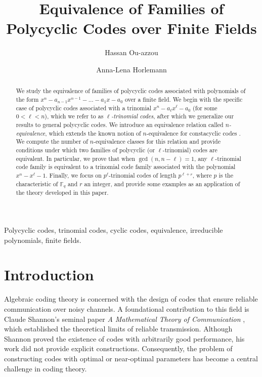 \documentclass[12pt]{elsarticle}
\title{\LARGE \bfseries
Equivalence of Families of Polycyclic   Codes over Finite Fields}
\newcommand{\Fq}{\mathbb{F}_{q}}
\theoremstyle{break}
{\theorembodyfont{\upshape}
    \newtheorem{theorem}{Theorem}[section] %
    \newtheorem{lemma}[theorem]{Lemma} %
    \newtheorem{proposition}[theorem]{Proposition}
    \newtheorem{corollary}[theorem]{Corollary}
    \newtheorem{definition}[theorem]{Definition}
    \newtheorem{example}[theorem]{Example}
    \newtheorem{remark}[theorem]{Remark}
    \newtheorem{conjecture}[theorem]{Conjecture}
    \newtheorem*{proof}{{Proof}}
	\newtheorem*{notation}{Notation}
	\newtheorem*{main}{Cain Theorem}
	\newtheorem*{problem}{Problem}
}
\begin{document}
	
 \begin{frontmatter}

\author[nm]{Hassan Ou-azzou} %
 \author[nm]{Anna-Lena Horlemann}
           
	
        		\address[nm]{ School of Computer Science, University of St.Gallen, St.\ Gallen, Switzerland }
                	
        		
        		
        		        		
\begin{abstract}
We study the equivalence of families of polycyclic codes associated with polynomials of the form  $x^n - a_{n-1}x^{n-1} - \ldots - a_1x - a_0$ 
over a finite field. We begin with the specific case of polycyclic codes associated with a trinomial $x^n - a_{\ell} x^{\ell} - a_0$ (for some $0< \ell <n$), which we refer to as \textit{$\ell$-trinomial codes},  after which we generalize our results to general polycyclic codes. We introduce an equivalence relation called \textit{$n$-equivalence}, which extends the known notion of $n$-equivalence for constacyclic codes \cite{Chen2014}. We compute the number of $n$-equivalence classes for this relation and provide conditions under which two families of polycyclic (or $\ell$-trinomial) codes are equivalent. In particular, we prove that when $\gcd(n, n-\ell) = 1$, any $\ell$-trinomial code family is equivalent to a trinomial code family associated with the polynomial $x^n - x^{\ell} - 1$. Finally, we focus on $p^{\ell}$-trinomial codes of length $p^{\ell+r}$, where $p$ is the characteristic of $\Fq$ and $r$ an integer, and provide some examples as an application of the theory developed in this paper.

\end{abstract}
 \begin{keyword}
Polycyclic codes, trinomial codes, cyclic codes,  equivalence, irreducible polynomials, finite fields.
 \end{keyword}
        	\end{frontmatter}

\section{Introduction}

Algebraic coding theory is concerned with the design of codes that ensure reliable communication over noisy channels. A foundational contribution to this field is Claude Shannon’s seminal paper \textit{A Mathematical Theory of Communication} \cite{Shannon1948}, which established the theoretical limits of reliable transmission. Although Shannon proved the existence of codes with arbitrarily good performance, his work did not provide explicit constructions. Consequently, the problem of constructing codes with optimal or near-optimal parameters has become a central challenge in coding theory.
\end{document}
